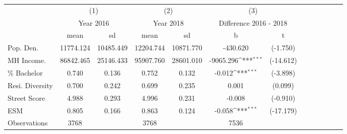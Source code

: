 {
\def\sym#1{\ifmmode^{#1}\else\(^{#1}\)\fi}
\begin{tabular}{l*{3}{cccc}}
\toprule
                &\multicolumn{2}{c}{(1)}&\multicolumn{2}{c}{(2)}&\multicolumn{2}{c}{(3)}     \\
                &\multicolumn{2}{c}{Year 2016}&\multicolumn{2}{c}{Year 2018}&\multicolumn{2}{c}{Difference 2016 - 2018}\\
                &     mean&       sd&     mean&       sd&        b         &        t\\
\midrule
Pop. Den.       &11774.124&10485.449&12204.744&10871.770& -430.620         & (-1.750)\\
MH Income.      &86842.465&25146.433&95907.760&28601.010&-9065.296\sym{***}&(-14.612)\\
\% Bachelor     &    0.740&    0.136&    0.752&    0.132&   -0.012\sym{***}& (-3.898)\\
Resi. Diversity &    0.700&    0.242&    0.699&    0.235&    0.001         &  (0.099)\\
Street Score    &    4.988&    0.293&    4.996&    0.231&   -0.008         & (-0.910)\\
ESM             &    0.805&    0.166&    0.863&    0.124&   -0.058\sym{***}&(-17.179)\\
\midrule
Observations    &     3768&         &     3768&         &     7536         &         \\
\bottomrule
\end{tabular}
}
